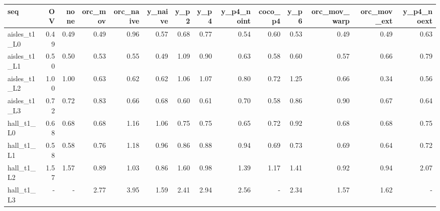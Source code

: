 \begin{tabular}{lrrrrrrrrrrrrr}
\toprule
seq & OV & none & orc\_mov & orc\_naive & y\_naive & y\_p2 & y\_p4 & y\_p4\_noint & coco\_p4 & y\_p6 & orc\_mov\_warp & orc\_mov\_ext & y\_p4\_noext \\
\midrule
aisles\_t1\_L0 & 0.49 & 0.49 & 0.49 & 0.96 & 0.57 & 0.68 & 0.77 & 0.54 & 0.60 & 0.53 & 0.49 & 0.49 & 0.63 \\
aisles\_t1\_L1 & 0.50 & 0.50 & 0.53 & 0.55 & 0.49 & 1.09 & 0.90 & 0.63 & 0.58 & 0.60 & 0.57 & 0.66 & 0.79 \\
aisles\_t1\_L2 & 1.00 & 1.00 & 0.63 & 0.62 & 0.62 & 1.06 & 1.07 & 0.80 & 0.72 & 1.25 & 0.66 & 0.34 & 0.56 \\
aisles\_t1\_L3 & 0.72 & 0.72 & 0.83 & 0.66 & 0.68 & 0.60 & 0.61 & 0.70 & 0.58 & 0.86 & 0.90 & 0.67 & 0.64 \\
hall\_t1\_L0 & 0.68 & 0.68 & 0.68 & 1.16 & 1.06 & 0.75 & 0.75 & 0.65 & 0.72 & 0.92 & 0.68 & 0.68 & 0.75 \\
hall\_t1\_L1 & 0.58 & 0.58 & 0.76 & 1.18 & 0.96 & 0.86 & 0.88 & 0.94 & 0.69 & 0.73 & 0.69 & 0.64 & 0.72 \\
hall\_t1\_L2 & 1.57 & 1.57 & 0.89 & 1.03 & 0.86 & 1.60 & 0.98 & 1.39 & 1.17 & 1.41 & 0.92 & 0.94 & 2.07 \\
hall\_t1\_L3 & - & - & 2.77 & 3.95 & 1.59 & 2.41 & 2.94 & 2.56 & - & 2.34 & 1.57 & 1.62 & - \\
\bottomrule
\end{tabular}
